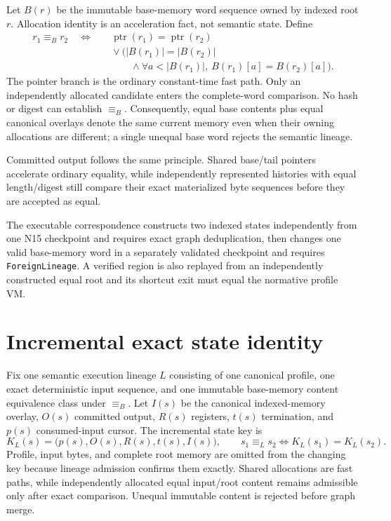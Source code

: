 \documentclass{article}
\begin{document}
Let $B(r)$ be the immutable base-memory word sequence owned by indexed root $r$.
Allocation identity is an acceleration fact, not semantic state. Define
\begin{equation}
  \begin{aligned}
    r_1\equiv_B r_2
    \quad\Longleftrightarrow\quad
    &\operatorname{ptr}(r_1)=\operatorname{ptr}(r_2) \\
    &{}\lor\bigl(|B(r_1)|=|B(r_2)| \\
    &\qquad\land
      \forall a<|B(r_1)|,\ B(r_1)[a]=B(r_2)[a]\bigr).
  \end{aligned}
  \label{eq:state-graph-cross-root-content-equivalence}
\end{equation}
The pointer branch is the ordinary constant-time fast path. Only an
independently
allocated candidate enters the complete-word comparison. No hash or digest can
establish $\equiv_B$. Consequently, equal base contents plus equal canonical
overlays denote the same current memory even when their owning allocations are
different; a single unequal base word rejects the semantic lineage.

Committed output follows the same principle. Shared base/tail pointers
accelerate
ordinary equality, while independently represented histories with equal
length/digest still compare their exact materialized byte sequences before they
are accepted as equal.

The executable correspondence constructs two indexed states independently from
one N15 checkpoint and requires exact graph deduplication, then changes one
valid
base-memory word in a separately validated checkpoint and requires
\texttt{ForeignLineage}. A verified region is also replayed from an
independently
constructed equal root and its shortcut exit must equal the normative profile
VM.

\section{Incremental exact state identity}

Fix one semantic execution lineage $L$ consisting of one canonical profile,
one exact deterministic input sequence, and one immutable base-memory content
equivalence class under $\equiv_B$. Let $I(s)$ be the
canonical indexed-memory overlay, $O(s)$ committed output, $R(s)$ registers,
$t(s)$ termination, and $p(s)$ consumed-input cursor. The incremental state key
is
\begin{equation}
  K_L(s)=\bigl(p(s),O(s),R(s),t(s),I(s)\bigr),
  \qquad
  s_1\equiv_L s_2 \Longleftrightarrow K_L(s_1)=K_L(s_2).
  \label{eq:state-graph-incremental-identity}
\end{equation}
Profile, input bytes, and complete root memory are omitted from the changing key
because lineage admission confirms them exactly. Shared allocations are fast
paths, while independently allocated equal input/root content remains admissible
only after exact comparison. Unequal immutable content is rejected before graph
merge.
\end{document}
